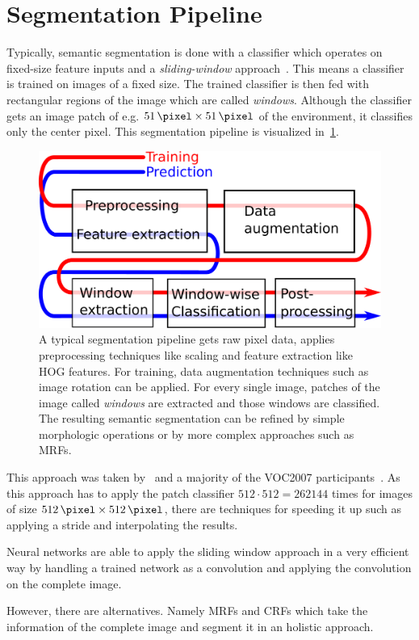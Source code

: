 
\section{Segmentation Pipeline}

Typically, semantic segmentation is done with a classifier which operates on
fixed-size feature inputs and a \textit{sliding-window}
approach~\cite{1467360,5490399,schroff2008object}. This means a classifier is
trained on images of a fixed size. The trained classifier is then fed with
rectangular regions of the image which are called \textit{windows}. Although
the classifier gets an image patch of e.g. $\SI{51}{\pixel} \times
\SI{51}{\pixel}$ of the environment, it classifies only the center pixel. This
segmentation pipeline is visualized in~\cref{fig:segmentation-pipeline}.

\begin{figure}
    \centering
    \includegraphics[width=\linewidth, keepaspectratio]{figures/segmentation-pipeline.pdf}
    \caption{A typical segmentation pipeline gets raw pixel data, applies
             preprocessing techniques like scaling and feature extraction like
             HOG features. For training, data augmentation techniques such as
             image rotation can be applied. For every single image, patches
             of the image called \textit{windows} are extracted and those
             windows are classified. The resulting semantic segmentation can
             be refined by simple morphologic operations or by more complex
             approaches such as \glspl{MRF}.}
    \label{fig:segmentation-pipeline}
\end{figure}

This approach was taken by~\cite{bittel2015pixel} and a majority of the VOC2007
participants~\cite{pascal-voc-2007}. As this approach has to apply the patch
classifier $512 \cdot 512 = \num{262144}$ times for images of size
$\SI{512}{\pixel} \times \SI{512}{\pixel}$, there are techniques for speeding
it up such as applying a stride and interpolating the results.

Neural networks are able to apply the sliding window approach in a very
efficient way by handling a trained network as a convolution and applying the
convolution on the complete image.

However, there are alternatives. Namely \glspl{MRF} and \glspl{CRF}
which take the information of the complete image and segment it in an holistic
approach.
